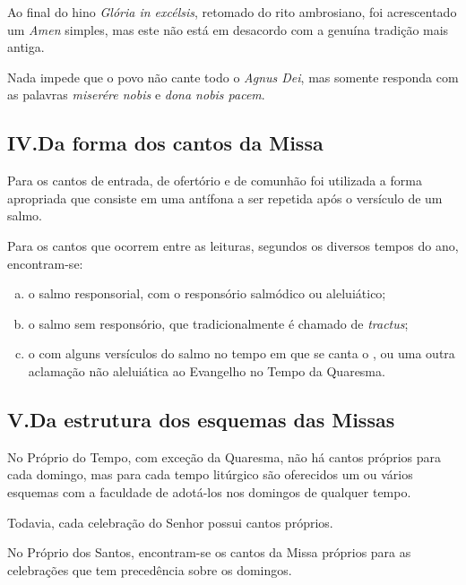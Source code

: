  Ao final do hino \textcolor{gregoriocolor}{\emph{Glória in excélsis}}, retomado do rito ambrosiano, foi acrescentado um \textcolor{gregoriocolor}{\emph{Amen}} simples, mas este não está em desacordo com a genuína tradição mais antiga.

 Nada impede que o povo não cante todo o \textcolor{gregoriocolor}{\emph{Agnus Dei}}, mas somente responda com as palavras \textcolor{gregoriocolor}{\emph{miserére nobis}} e \textcolor{gregoriocolor}{\emph{dona nobis pacem}}.

\subsection{IV.\@ Da forma dos cantos da Missa}

 Para os cantos de entrada, de ofertório e de comunhão foi utilizada a forma apropriada que consiste em uma antífona a ser repetida após o versículo de um salmo.

 Para os cantos que ocorrem entre as leituras, segundos os diversos tempos do ano, encontram-se:
\begin{enumerate}[a)]
  \item o salmo responsorial, com o responsório salmódico ou aleluiático;

  \item o salmo sem responsório, que tradicionalmente é chamado de \emph{tractus};

  \item o {\Al} com alguns versículos do salmo no tempo em que se canta o \textcolor{gregoriocolor}{\Al}, ou uma outra aclamação não aleluiática ao Evangelho no Tempo da Quaresma.
\end{enumerate}

\subsection{V.\@ Da estrutura dos esquemas das Missas}\label{subsection:praenotanda-5}

 No Próprio do Tempo, com exceção da Quaresma, não há cantos próprios para cada domingo, mas para cada tempo litúrgico são oferecidos um ou vários esquemas com a faculdade de adotá-los nos domingos de qualquer tempo.

Todavia, cada celebração do Senhor possui cantos próprios.

 No Próprio dos Santos, encontram-se os cantos da Missa próprios para as celebrações que tem precedência sobre os domingos.

